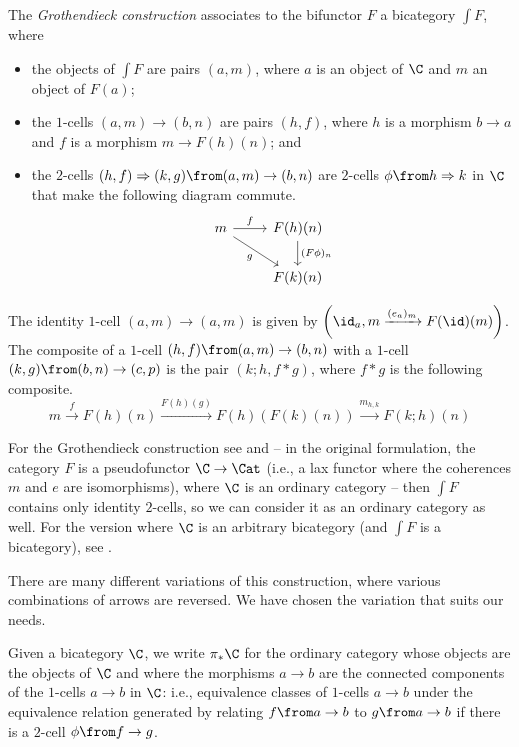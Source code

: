 \begin{definition}
  The \emph{Grothendieck construction} associates to the bifunctor $F$ a bicategory $\int F$, where
  \begin{itemize}
    \item the objects of $\int F$ are pairs $(a, m)$, where $a$ is an object of $\C$ and $m$ an object of $F(a)$;
    \item the $1$-cells $(a, m) \to (b, n)$ are pairs $(h, f)$, where $h$ is a morphism $b \to a$ and $f$ is a morphism $m \to F(h)(n)$; and
    \item the $2$-cells $(h, f) \Rightarrow (k, g) \from (a,m) \to (b,n)$ are $2$-cells $\phi\from h \Rightarrow k$ in $\C$ that make the following diagram commute.
      \[
        \begin{tikzcd}
          m \arrow[r, "f"] \arrow[dr, "g"']
            & F(h)(n) \arrow[d, "(F\phi)_n"] \\
            & F(k)(n)
        \end{tikzcd}
        \]
  \end{itemize}
  The identity $1$-cell $(a,m)\to(a,m)$ is given by $\left(\id_a,m \xrightarrow{(e_a)_m} F(\id)(m)\right)$.
  The composite of a $1$-cell $(h,f)\from (a,m) \to (b,n)$ with a $1$-cell $(k,g)\from (b,n) \to (c,p)$ is the pair $(k;h,f*g)$, where $f*g$ is the following composite.
  \[
    m \xrightarrow{f}
    F(h)(n) \xrightarrow{F(h)(g)}
    F(h)(F(k)(n)) \xrightarrow{m_{h,k}}
    F(k;h)(n)
    \]
\end{definition}
\begin{remark}
  For the Grothendieck construction see \cite[VI.8]{SGA1} and \cite[B1.3.1]{Elephant} -- in the original formulation, the category $F$ is a pseudofunctor $\C \to \Cat$ (i.e., a lax functor where the coherences $m$ and $e$ are isomorphisms), where $\C$ is an ordinary category -- then $\int F$ contains only identity $2$-cells, so we can consider it as an ordinary category as well.
  For the version where $\C$ is an arbitrary bicategory (and $\int F$ is a bicategory), see \cite{FibrationsInBicategories}.

  There are many different variations of this construction, where various combinations of arrows are reversed.  
  We have chosen the variation that suits our needs.
\end{remark}

\begin{definition}
  Given a bicategory $\C$, we write $\pi_*\C$ for the ordinary category whose objects are the objects of $\C$ and where the morphisms $a\to b$ are the connected components of the $1$-cells $a\to b$ in $\C$: i.e., equivalence classes of $1$-cells $a\to b$ under the equivalence relation generated by relating $f\from a \to b$ to $g \from a \to b$ if there is a $2$-cell $\phi \from f \to g$.
\end{definition}

